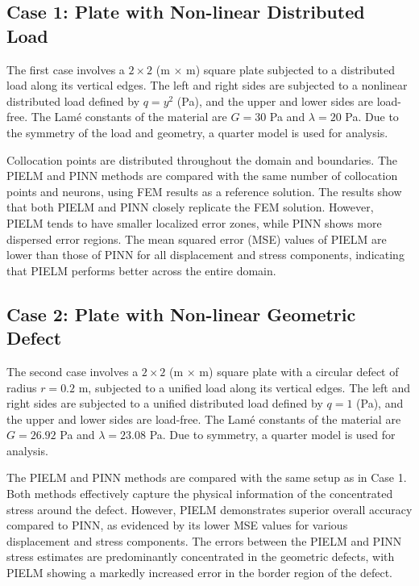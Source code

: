 \documentclass[11pt]{article}
\begin{document}
\subsection{Case 1: Plate with Non-linear Distributed Load}

The first case involves a $2 \times 2$ (m $\times$ m) square plate subjected to a distributed load along its vertical edges. The left and right sides are subjected to a nonlinear distributed load defined by $q=y^2$ (Pa), and the upper and lower sides are load-free. The Lamé constants of the material are $G=30$ Pa and $\lambda=20$ Pa. Due to the symmetry of the load and geometry, a quarter model is used for analysis.

Collocation points are distributed throughout the domain and boundaries. The PIELM and PINN methods are compared with the same number of collocation points and neurons, using FEM results as a reference solution. The results show that both PIELM and PINN closely replicate the FEM solution. However, PIELM tends to have smaller localized error zones, while PINN shows more dispersed error regions. The mean squared error (MSE) values of PIELM are lower than those of PINN for all displacement and stress components, indicating that PIELM performs better across the entire domain.

\subsection{Case 2: Plate with Non-linear Geometric Defect}

The second case involves a $2 \times 2$ (m $\times$ m) square plate with a circular defect of radius $r=0.2$ m, subjected to a unified load along its vertical edges. The left and right sides are subjected to a unified distributed load defined by $q=1$ (Pa), and the upper and lower sides are load-free. The Lamé constants of the material are $G=26.92$ Pa and $\lambda=23.08$ Pa. Due to symmetry, a quarter model is used for analysis.

The PIELM and PINN methods are compared with the same setup as in Case 1. Both methods effectively capture the physical information of the concentrated stress around the defect. However, PIELM demonstrates superior overall accuracy compared to PINN, as evidenced by its lower MSE values for various displacement and stress components. The errors between the PIELM and PINN stress estimates are predominantly concentrated in the geometric defects, with PIELM showing a markedly increased error in the border region of the defect.
\end{document}
